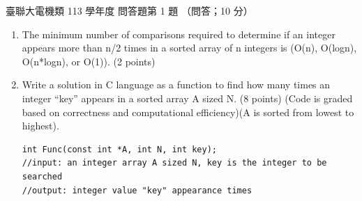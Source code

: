 \begin{pastexam}[label={px:ust-113-ee-ds-17}]{臺聯大電機類 113 學年度 問答題第 1 題}
（問答；10 分）

\begin{enumerate}[label=(\Alph*)]
\item The minimum number of comparisons required to determine if an integer appears more than n/2
times in a sorted array of n integers is \underline{\hspace{2.5cm}} (O(n), O(logn), O(n*logn), or
O(1)). (2 points)
\item Write a solution in C language as a function to find how many times an integer ``key''
appears in a sorted array A sized N. (8 points) (Code is graded based on correctness and
computational efficiency)(A is sorted from lowest to highest).
\begin{verbatim}
int Func(const int *A, int N, int key);
//input: an integer array A sized N, key is the integer to be searched
//output: integer value "key" appearance times
\end{verbatim}
\end{enumerate}
\end{pastexam}

